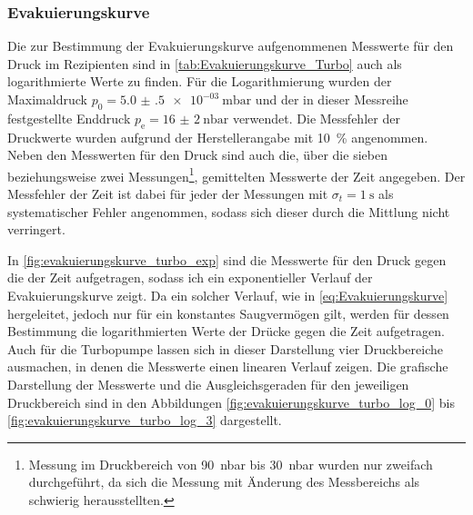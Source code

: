 \subsubsection{Evakuierungskurve}
Die zur Bestimmung der Evakuierungskurve aufgenommenen Messwerte für den Druck
im Rezipienten sind in \cref{tab:Evakuierungskurve_Turbo} auch als logarithmierte
Werte zu finden. Für die Logarithmierung wurden der Maximaldruck $p_{0} =\SI{5.0(5)e-03}{\milli\bar} $
und der in dieser Messreihe festgestellte Enddruck $p_{\mathrm{e}} =\SI{16(2)}{\nano\bar}$ verwendet.
Die Messfehler der Druckwerte wurden aufgrund der Herstellerangabe \cite{DatenblattV70} mit \SI{10}{\percent} angenommen.
Neben den Messwerten für den Druck sind auch die, über die sieben beziehungsweise zwei Messungen\footnote{
Messung im Druckbereich von \SI{90}{\nano\bar} bis \SI{30}{\nano\bar} wurden nur zweifach durchgeführt,
da sich die Messung mit Änderung des Messbereichs als schwierig herausstellten.}, 
gemittelten Messwerte der Zeit angegeben. Der Messfehler der Zeit ist dabei für jeder der Messungen mit
$\sigma_{t} = \SI{1}{\s}$ als systematischer Fehler angenommen, sodass sich dieser durch die Mittlung nicht verringert.


In \cref{fig:evakuierungskurve_turbo_exp} sind die Messwerte für den Druck gegen die der Zeit aufgetragen,
sodass ich ein exponentieller Verlauf der Evakuierungskurve zeigt. Da ein solcher Verlauf, wie in 
\eqref{eq:Evakuierungskurve} hergeleitet, jedoch nur für ein konstantes Saugvermögen gilt, werden für dessen Bestimmung die logarithmierten Werte der Drücke gegen die Zeit aufgetragen.
Auch für die Turbopumpe lassen sich in dieser Darstellung vier Druckbereiche ausmachen,
in denen die Messwerte einen linearen Verlauf zeigen. Die grafische Darstellung der Messwerte und die 
Ausgleichsgeraden für den jeweiligen Druckbereich sind in den Abbildungen \ref{fig:evakuierungskurve_turbo_log_0} 
bis \ref{fig:evakuierungskurve_turbo_log_3} dargestellt.\\

{%

\FloatBarrier}

{%

\FloatBarrier

\FloatBarrier

\FloatBarrier

\FloatBarrier}

